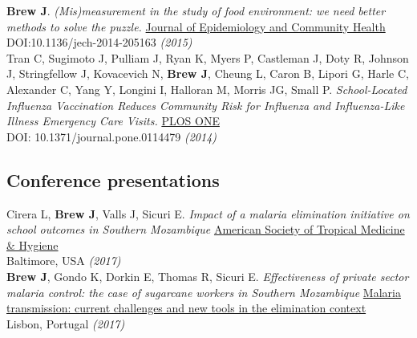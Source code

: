 \documentclass[11pt]{article}
\begin{document}
\noindent \textbf{Brew J}. \emph{(Mis)measurement in the study of food environment: we need better methods to solve the puzzle.} \href{http://jech.bmj.com/}{Journal of Epidemiology and Community Health} \\
DOI:10.1136/jech-2014-205163 \hfill \emph{(2015)}\\


\noindent Tran C, Sugimoto J, Pulliam J, Ryan K, Myers P, Castleman J, Doty R, Johnson J, Stringfellow J, Kovacevich N, \textbf{Brew J}, Cheung L, Caron B, Lipori G, Harle C, Alexander C, Yang Y, Longini I, Halloran M, Morris JG, Small P. \emph{School-Located Influenza Vaccination Reduces Community Risk for Influenza and Influenza-Like Illness Emergency Care Visits.} \href{http://journals.plos.org/plosone/article?id=10.1371/journal.pone.0114479}{PLOS ONE} \\
DOI: 10.1371/journal.pone.0114479 \hfill \emph{(2014)}\\

% 


\subsection*{Conference presentations}



\noindent Cirera L, \textbf{Brew J}, Valls J, Sicuri E. \emph{Impact of a malaria elimination initiative on school outcomes in Southern Mozambique} \href{http://www.astmh.org/annual-meeting}{American Society of Tropical Medicine & Hygiene} \\
Baltimore, USA \hfill \emph{(2017)}\\

\noindent \textbf{Brew J}, Gondo K, Dorkin E, Thomas R, Sicuri E. \emph{Effectiveness of private sector malaria control: the case of sugarcane workers in Southern Mozambique} \href{http://www.ihmt.unl.pt/en/workshop-malaria-transmission-en/}{Malaria transmission: current challenges and new tools in the elimination context} \\
Lisbon, Portugal \hfill \emph{(2017)}\\
\end{document}
